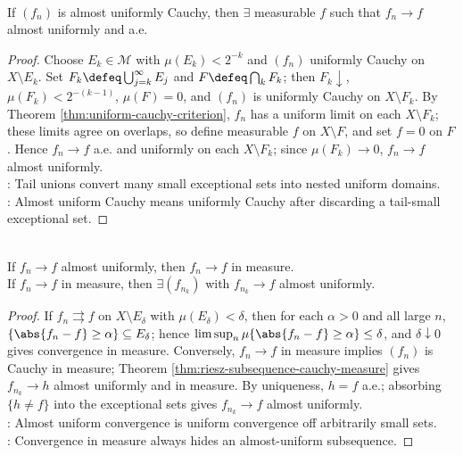 \begin{lemma} \label{lem:almost-uniform-cauchy-has-ae-limit} \\
If $(f_n)$ is almost uniformly Cauchy, then $\exists$ measurable $f$ such that $f_n\to f$ almost uniformly and a.e.
\begin{proof}
Choose $E_k\in\mathcal{M}$ with $\mu(E_k)<2^{-k}$ and $(f_n)$ uniformly Cauchy on $X\setminus E_k$. Set $F_k\defeq\bigcup_{j=k}^{\infty}E_j$ and $F\defeq\bigcap_kF_k$; then $F_k\downarrow$, $\mu(F_k)<2^{-(k-1)}$, $\mu(F)=0$, and $(f_n)$ is uniformly Cauchy on $X\setminus F_k$. By Theorem \ref{thm:uniform-cauchy-criterion}, $f_n$ has a uniform limit on each $X\setminus F_k$; these limits agree on overlaps, so define measurable $f$ on $X\setminus F$, and set $f=0$ on $F$. Hence $f_n\to f$ a.e. and uniformly on each $X\setminus F_k$; since $\mu(F_k)\to0$, $f_n\to f$ almost uniformly.\\
: Tail unions convert many small exceptional sets into nested uniform domains.\\
: Almost uniform Cauchy means uniformly Cauchy after discarding a tail-small exceptional set.
\end{proof}
\end{lemma}

\begin{theorem} \label{thm:almost-uniform-and-measure-subsequences} \\
If $f_n\to f$ almost uniformly, then $f_n\to f$ in measure.\\
If $f_n\to f$ in measure, then $\exists(f_{n_k})$ with $f_{n_k}\to f$ almost uniformly.
\begin{proof}
If $f_n\rightrightarrows f$ on $X\setminus E_\delta$ with $\mu(E_\delta)<\delta$, then for each $\alpha>0$ and all large $n$, $\{\abs{f_n-f}\geq\alpha\}\subseteq E_\delta$; hence $\limsup_n\mu\{\abs{f_n-f}\geq\alpha\}\leq\delta$, and $\delta\downarrow0$ gives convergence in measure. Conversely, $f_n\to f$ in measure implies $(f_n)$ is Cauchy in measure; Theorem \ref{thm:riesz-subsequence-cauchy-measure} gives $f_{n_k}\to h$ almost uniformly and in measure. By uniqueness, $h=f$ a.e.; absorbing $\{h\neq f\}$ into the exceptional sets gives $f_{n_k}\to f$ almost uniformly.\\
: Almost uniform convergence is uniform convergence off arbitrarily small sets.\\
: Convergence in measure always hides an almost-uniform subsequence.
\end{proof}
\end{theorem}

